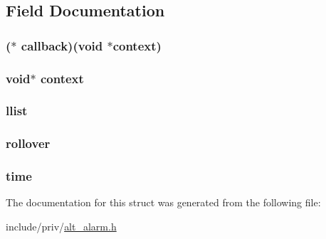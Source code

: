 \subsection{\-Field \-Documentation}
\hypertarget{structalt__alarm__s_a2357171a3a2fc264d0c97105037b86e9}{
\subsubsection[{callback}]{($\ast$ {\bf callback})(void $\ast${\bf context})}}\label{structalt__alarm__s_a2357171a3a2fc264d0c97105037b86e9}
\hypertarget{structalt__alarm__s_ae376f130b17d169ee51be68077a89ed0}{
\subsubsection[{context}]{\setlength{\rightskip}{0pt plus 5cm}void$\ast$ {\bf context}}}\label{structalt__alarm__s_ae376f130b17d169ee51be68077a89ed0}
\hypertarget{structalt__alarm__s_a135bc0be285afc59289210771ad9c136}{
\subsubsection[{llist}]{ {\bf llist}}}\label{structalt__alarm__s_a135bc0be285afc59289210771ad9c136}
\hypertarget{structalt__alarm__s_abadb320003185a211185e3b1aa460e0e}{
\subsubsection[{rollover}]{ {\bf rollover}}}\label{structalt__alarm__s_abadb320003185a211185e3b1aa460e0e}
\hypertarget{structalt__alarm__s_a4e7da19ec56884ee96afc7fdb928cc84}{
\subsubsection[{time}]{ {\bf time}}}\label{structalt__alarm__s_a4e7da19ec56884ee96afc7fdb928cc84}


\-The documentation for this struct was generated from the following file\-:\begin{DoxyCompactItemize}
\item 
include/priv/\hyperlink{priv_2alt__alarm_8h}{alt\-\_\-alarm.\-h}\end{DoxyCompactItemize}
